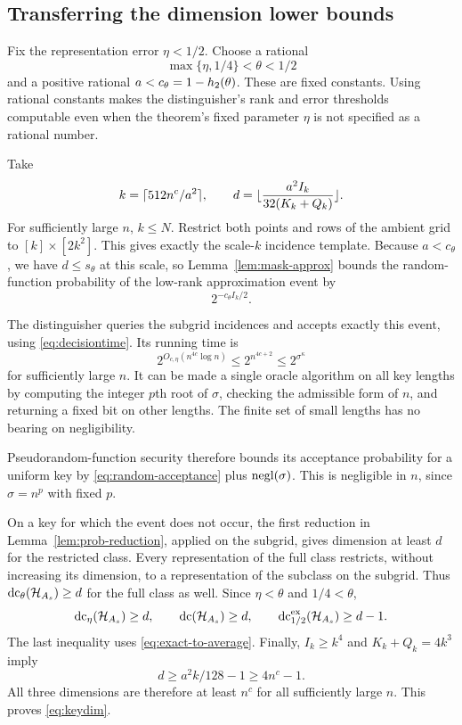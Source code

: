 \subsection{Transferring the dimension lower bounds}
Fix the representation error $\eta<1/2$. Choose a rational
\[
 \max\{\eta,1/4\}<\theta<1/2
\]
and a positive rational $a<c_\theta=1-h_2(\theta)$. These are fixed constants. Using rational constants makes the distinguisher's rank and error thresholds computable even when the theorem's fixed parameter $\eta$ is not specified as a rational number.

Take
\begin{equation}
 k=\lceil 512n^c/a^2\rceil,\qquad
 d=\lfloor \frac{a^2 I_k}{32(K_k+Q_k)}\rfloor.
\label{eq:subgridparameters}
\end{equation}
For sufficiently large $n$, $k\le N$. Restrict both points and rows of the ambient grid to $[k]\times[2k^2]$. This gives exactly the scale-$k$ incidence template. Because $a<c_\theta$, we have $d\le s_\theta$ at this scale, so Lemma~\ref{lem:mask-approx} bounds the random-function probability of the low-rank approximation event by
\begin{equation}
 2^{-c_\theta I_k/2}.
\label{eq:random-acceptance}
\end{equation}

The distinguisher queries the subgrid incidences and accepts exactly this event, using \eqref{eq:decisiontime}. Its running time is
\[
 2^{O_{c,\eta}(n^{4c}\log n)}
 \le2^{n^{4c+2}}
 \le2^{\sigma^\kappa}
\]
for sufficiently large $n$. It can be made a single oracle algorithm on all key lengths by computing the integer $p$th root of $\sigma$, checking the admissible form of $n$, and returning a fixed bit on other lengths. The finite set of small lengths has no bearing on negligibility.

Pseudorandom-function security therefore bounds its acceptance probability for a uniform key by \eqref{eq:random-acceptance} plus $\operatorname{negl}(\sigma)$. This is negligible in $n$, since $\sigma=n^p$ with fixed $p$.

On a key for which the event does not occur, the first reduction in Lemma~\ref{lem:prob-reduction}, applied on the subgrid, gives dimension at least $d$ for the restricted class. Every representation of the full class restricts, without increasing its dimension, to a representation of the subclass on the subgrid. Thus $\operatorname{dc}_\theta(\mathcal H_{A_s})\ge d$ for the full class as well. Since $\eta<\theta$ and $1/4<\theta$,
\[
 \operatorname{dc}_\eta(\mathcal H_{A_s})\ge d,\qquad
 \operatorname{dc}(\mathcal H_{A_s})\ge d,\qquad
 \operatorname{dc}^{\mathrm{ex}}_{1/2}(\mathcal H_{A_s})\ge d-1.
\]
The last inequality uses \eqref{eq:exact-to-average}. Finally, $I_k\ge k^4$ and $K_k+Q_k=4k^3$ imply
\[
 d\ge a^2k/128-1\ge4n^c-1.
\]
All three dimensions are therefore at least $n^c$ for all sufficiently large $n$. This proves \eqref{eq:keydim}.

